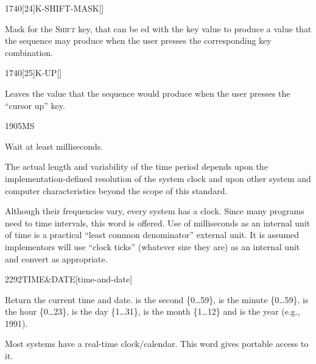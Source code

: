 \begin{worddef}{1740}[24]{K-SHIFT-MASK}[]%
\item {}

	Mask for the \textsc{Shift} key, that can be ed with the
	key value to produce a value that the sequence 
	 may produce when the user presses the
	corresponding key combination.

\end{worddef}


\begin{worddef}{1740}[25]{K-UP}[]%
\item {}

	Leaves the value  that the sequence 
	 would produce when the user presses the
	``cursor up'' key.

\end{worddef}


\begin{worddef}{1905}{MS}
\item {}

	Wait at least  milliseconds.

\note
	The actual length and variability of the time period depends
	upon the {im\-ple\-ment\-ation-de\-fin\-ed} resolution of the system clock
	and upon other system and computer characteristics beyond the
	scope of this standard.

	\begin{rationale} %
		Although their frequencies vary, every system has a clock.
		Since many programs need to time intervals, this word is
		offered. Use of milliseconds as an internal unit of time is
		a practical ``least common denominator'' external unit. It
		is assumed implementors will use ``clock ticks'' (whatever
		size they are) as an internal unit and convert as appropriate.
	\end{rationale}
\end{worddef}

\enlargethispage{4ex}
\begin{worddef}[TIMEandDATE]{2292}{TIME\&DATE}[time-and-date]
\item {}

	Return the current time and date.
	 is the second \{0{\ldots}59\},
	 is the minute \{0{\ldots}59\},
	 is the hour \{0{\ldots}23\},
	 is the day \{1{\ldots}31\},
	 is the month \{1{\ldots}12\} and
	 is the year (e.g., 1991).

	\begin{rationale} %
		Most systems have a real-time clock/calendar.
		This word gives portable access to it.
	\end{rationale}
\end{worddef}
